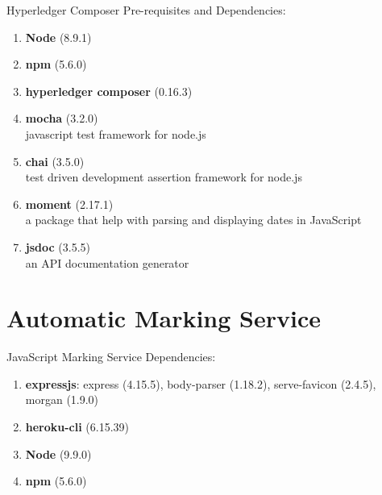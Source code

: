 Hyperledger Composer Pre-requisites and Dependencies:

\begin{enumerate}
	\setlength\itemsep{0em}
	\item \textbf{Node} (8.9.1)
	\item \textbf{npm} (5.6.0)
	\item \textbf{hyperledger composer} (0.16.3)
	\item \textbf{mocha} (3.2.0)\\
	      javascript test framework for node.js
	\item \textbf{chai} (3.5.0)\\
	      test driven development assertion framework for node.js
	\item \textbf{moment} (2.17.1)\\
	      a package that help with parsing and displaying dates in JavaScript
	\item \textbf{jsdoc} (3.5.5)\\
	      an API documentation generator
\end{enumerate}

\section{Automatic Marking Service}

JavaScript Marking Service Dependencies:

\begin{enumerate}
	\setlength\itemsep{0em}	
	\item \textbf{expressjs}: express (4.15.5), body-parser (1.18.2), serve-favicon (2.4.5), morgan (1.9.0)
	\item \textbf{heroku-cli} (6.15.39)
	\item \textbf{Node} (9.9.0)
	\item \textbf{npm} (5.6.0)
\end{enumerate}
